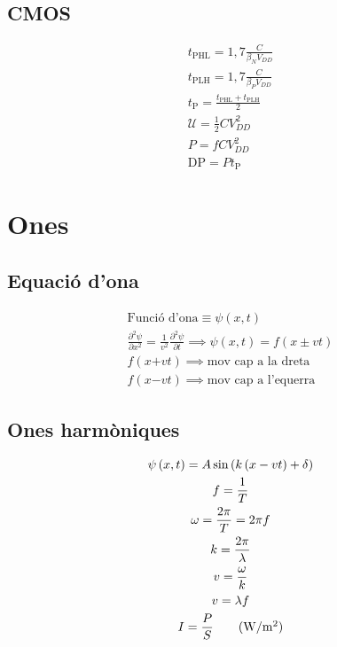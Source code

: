 \documentclass[10pt,twocolumn]{article}
\begin{document}
\subsection{CMOS}
\begin{gather*}
    t_\text{PHL} = 1,7\frac{C}{\beta_N V_{DD}} \\
    t_\text{PLH} = 1,7\frac{C}{\beta_P V_{DD}} \\
    t_\text{P} = \frac{t_\text{PHL} + t_\text{PLH}}{2} \\
    \mathcal{U} = \frac{1}{2} C V_{DD}^2 \\
    P = fCV_{DD}^2 \\
    \text{DP} = Pt_\text{P}
\end{gather*}

\section{Ones}
\subsection{Equació d'ona}
\begin{gather*}
    \text{Funció d'ona} \equiv \psi \left(x, t\right) \\
    \frac{\partial^2 \psi}{\partial x^2} = \frac{1}{v^2}\frac{\partial^2\psi}{\partial t} \implies \psi\left(x, t\right) = f\left(x \pm vt\right) \\
    f\left(x \bm{+} vt\right) \implies \text{mov cap a la dreta} \\
    f\left(x \bm{-} vt\right) \implies \text{mov cap a l'equerra}
\end{gather*}
\subsection{Ones harmòniques}
\begin{gather*}
    \psi\left(x, t\right) = A\sin\left(k\left(x - vt\right) + \delta \right) \\
    f = \frac{1}{T} \\
    \omega = \frac{2\pi}{T} = 2\pi f \\
    k = \frac{2\pi}{\lambda} \\
    v = \frac{\omega}{k} \\
    v = \lambda f \\
    I = \frac{P}{S} \tag{\si{W/m^2}}
\end{gather*}
\end{document}
